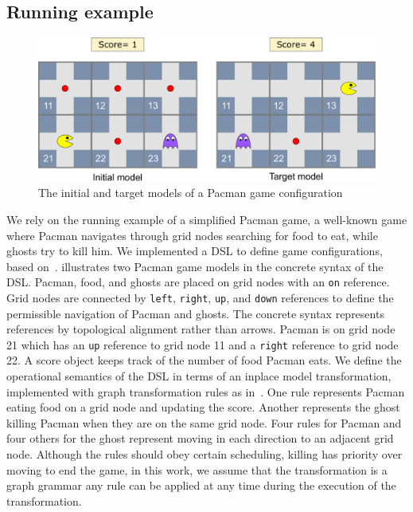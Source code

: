 \subsection{Running example}\label{sec:example}

\begin{figure}
    \centering
    \includegraphics[width=.8\linewidth]{images/pacman_example}
    \caption{The initial and target models of a Pacman game configuration}
    \label{fig:example}
\end{figure}
%
We rely on the running example of a simplified Pacman game, a well-known game where Pacman navigates through grid nodes searching for food to eat, while ghosts try to kill him.
We implemented a DSL to define game configurations, based on~\cite{Syriani2013a}.
 illustrates two Pacman game models in the concrete syntax of the DSL.
Pacman, food, and ghosts are placed on grid nodes with an \texttt{on} reference.
Grid nodes are connected by \texttt{left}, \texttt{right}, \texttt{up}, and \texttt{down} references to define the permissible navigation of Pacman and ghosts.
The concrete syntax represents references by topological alignment rather than arrows.
Pacman is on grid node 21 which has an \texttt{up} reference to grid node 11 and a \texttt{right} reference to grid node 22.
A score object keeps track of the number of food Pacman eats.
We define the operational semantics of the DSL in terms of an inplace model transformation, implemented with graph transformation rules as in~\cite{Syriani2013a}.
One rule represents Pacman eating food on a grid node and updating the score.
Another represents the ghost killing Pacman when they are on the same grid node.
Four rules for Pacman and four others for the ghost represent moving in each direction to an adjacent grid node.
Although the rules should obey certain scheduling, \eg killing has priority over moving to end the game, in this work, we assume that the transformation is a graph grammar \ie any rule can be applied at any time during the execution of the transformation.

